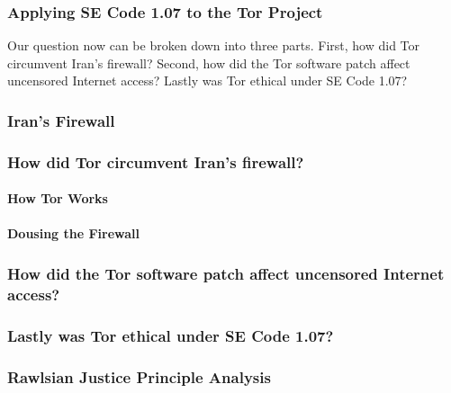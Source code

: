 \documentclass[11pt]{article}
\begin{document}
\begin{multicols}{2}
\subsubsection{Applying SE Code 1.07 to the Tor Project}

\newline

Our question now can be broken down into three parts. First, how did Tor
circumvent Iran's firewall? Second, how did the Tor software patch affect
uncensored Internet access?  Lastly was Tor ethical under SE Code 1.07?

\subsubsection{Iran's Firewall}

\subsubsection{How did Tor circumvent Iran's firewall?}

\paragraph{How Tor Works}

\paragraph{Dousing the Firewall}

\subsubsection{How did the Tor software patch affect uncensored Internet
access?}

\subsubsection{Lastly was Tor ethical under SE Code 1.07?}

\subsubsection{Rawlsian Justice Principle Analysis}


\end{multicols}
\end{document}
